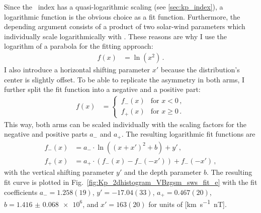 Since the \Kp~index has a quasi-logarithmic scaling (see \autoref{sec:kp_index}), a logarithmic function is the obvious choice as a fit function. Furthermore, the depending argument consists of a product of two solar-wind parameters which individually scale logarithmically with \Kp{}. These reasons are why I use the logarithm of a parabola for the fitting approach:
\begin{align}
	f(x) &= \ln\left(x^2\right)	\,.	\label{eq:log_square_function}
\end{align}
I also introduce a horizontal shifting parameter $x'$ because the distribution's center is slightly offset. To be able to replicate the asymmetry in both arms, I further split the fit function into a negative and a positive part:
\begin{align}
	f(x) &=
	\begin{cases}
		\,f_-(x) &\text{for } x < 0	\,,\\
		\,f_+(x) &\text{for } x \ge 0	\,.
	\end{cases}	\label{eq:log_square_fit_function}
\end{align}
This way, both arms can be scaled individually with the scaling factors for the negative and positive parts $a_-$ and $a_+$. The resulting logarithmic fit functions are
\begin{align}
	f_-(x) &= a_- \cdot \ln\left(\left(x + x'\right)^2 + b\right) + y'	\,,\\
	f_+(x) &= a_+ \cdot \left(f_-(x) - f_-\left(-x'\right)\right) + f_-\left(-x'\right)	\,,
\end{align}
with the vertical shifting parameter $y'$ and the depth parameter $b$. The resulting fit curve is plotted in Fig.~\ref{fig:Kp_2dhistogram_VBzgsm_sws_fit_e} with the fit coefficients $a_- = 1.258(19)$, $y' = -17.04(33)$, $a_+ = 0.467(20)$, $b = \num{1.416(68)e6}$, and $x' = 163(20)$ for units of [\si{\km\per\s \nano\tesla}].
